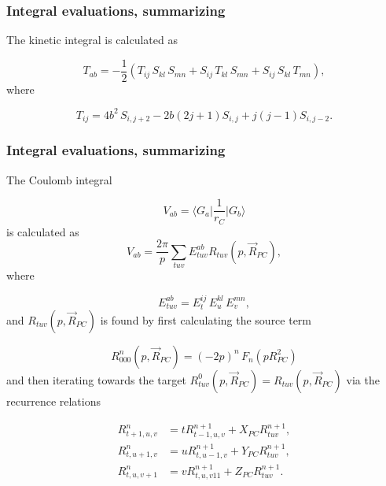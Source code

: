 \documentclass{beamer}
\begin{document}
\begin{frame}
\frametitle{Integral evaluations, summarizing}

\begin{block}{}

The kinetic integral is calculated as

\begin{equation}
 T_{ab} = -\frac{1}{2}(T_{ij}\,S_{kl}\,S_{mn} + S_{ij}\,T_{kl}\,S_{mn} + S_{ij}\,S_{kl}\,T_{mn}),
\end{equation}
where

\begin{equation}
 T_{ij} = 4b^2\,S_{i,j+2} - 2b(2j + 1)S_{i,j} + j(j-1)S_{i,j-2}.
\end{equation}
\end{block}
\end{frame}

\begin{frame}
\frametitle{Integral evaluations, summarizing}

\begin{block}{}

The Coulomb integral

\begin{equation}
 V_{ab} = \langle G_a\vert\frac{1}{r_C}\vert G_b\rangle
\end{equation}
is calculated as
\begin{equation}
 V_{ab} = \frac{2\pi}{p}\sum_{tuv}E^{ab}_{tuv} R_{tuv}(p,\vec R_{PC}),
\end{equation}
where

\begin{equation}
 E^{ab}_{tuv} = E^{ij}_t\,E^{kl}_u\,E^{mn}_v,
\end{equation}
and $R_{tuv}(p,\vec R_{PC})$ is found by first calculating the source term

\begin{equation}
 R^n_{000}(p,\vec R_{PC}) = (-2p)^n\,F_n(p R^2_{PC})
\end{equation}
and then iterating towards the target $R^0_{tuv}(p,\vec R_{PC}) = R_{tuv}(p,\vec R_{PC})$ via the recurrence relations

\begin{equation}
 \begin{split}
  R^n_{t+1,u,v} & = tR^{n+1}_{t-1,u,v} + X_{PC} R^{n+1}_{tuv}, \\
  R^n_{t,u+1,v} & = uR^{n+1}_{t,u-1,v} + Y_{PC} R^{n+1}_{tuv}, \\
  R^n_{t,u,v+1} & = vR^{n+1}_{t,u,v11} + Z_{PC} R^{n+1}_{tuv}.
 \end{split}
\end{equation}
\end{block}
\end{frame}
\end{document}
